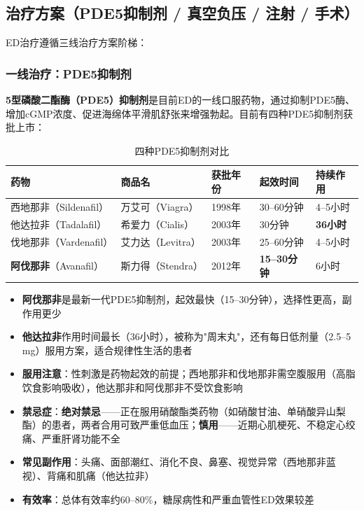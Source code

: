 \subsection{治疗方案（PDE5抑制剂 / 真空负压 / 注射 / 手术）}

ED治疗遵循三线治疗方案阶梯：

\subsubsection{一线治疗：PDE5抑制剂}

\textbf{5型磷酸二酯酶（PDE5）抑制剂}是目前ED的一线口服药物，通过抑制PDE5酶、增加cGMP浓度、促进海绵体平滑肌舒张来增强勃起。目前有四种PDE5抑制剂获批上市：

\begin{table}[htbp]
\centering
\caption{四种PDE5抑制剂对比}
\label{tab:pde5_inhibitors}
\begin{tabularx}{\textwidth}{@{}lllll@{}}
    \toprule
    \textbf{药物} & \textbf{商品名} & \textbf{获批年份} & \textbf{起效时间} & \textbf{持续作用} \\
    \midrule
    西地那非（Sildenafil） & 万艾可（Viagra） & 1998年 & 30--60分钟 & 4--5小时 \\
    他达拉非（Tadalafil） & 希爱力（Cialis） & 2003年 & 30分钟 & \textbf{36小时} \\
    伐地那非（Vardenafil） & 艾力达（Levitra） & 2003年 & 25--60分钟 & 4--5小时 \\
    \textbf{阿伐那非}（Avanafil） & 斯力得（Stendra） & 2012年 & \textbf{15--30分钟} & 6小时 \\
    \bottomrule
\end{tabularx}
\end{table}

\begin{itemize}[leftmargin=2cm]
	\item \textbf{阿伐那非}是最新一代PDE5抑制剂，起效最快（15--30分钟），选择性更高，副作用更少
	\item \textbf{他达拉非}作用时间最长（36小时），被称为"周末丸"，还有每日低剂量（2.5--5 mg）服用方案，适合规律性生活的患者
	\item \textbf{服用注意}：性刺激是药物起效的前提；西地那非和伐地那非需空腹服用（高脂饮食影响吸收），他达那非和阿伐那非不受饮食影响
	\item \textbf{禁忌症}：\textbf{绝对禁忌}——正在服用硝酸酯类药物（如硝酸甘油、单硝酸异山梨酯）的患者，两者合用可致严重低血压；\textbf{慎用}——近期心肌梗死、不稳定心绞痛、严重肝肾功能不全
	\item \textbf{常见副作用}：头痛、面部潮红、消化不良、鼻塞、视觉异常（西地那非蓝视）、背痛和肌痛（他达拉非）
	\item \textbf{有效率}：总体有效率约60--80\%，糖尿病性和严重血管性ED效果较差
\end{itemize}

